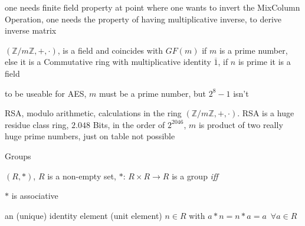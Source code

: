 \documentclass[landscape, a4paper]{article}
\begin{document}
\begin{minipage}[t]{0.2\linewidth}
\begin{betterlist}
\begin{betterlist}
\begin{betterlist}
				\item one needs finite field property at point where one wants to invert the MixColumn Operation, one needs the property of having multiplicative inverse, to derive inverse matrix
			\end{betterlist}
			\item $(\mathbb{Z}/m\mathbb{Z}, +, \cdot)$, is a \alert{field} and coincides with $GF(m)$ if $m$ is a prime number, else it is a Commutative ring with multiplicative identity $\overline{1}$, if $n$ is prime it is a field
			\begin{betterlist}
				\item to be useable for AES, $m$ must be a prime number, but $2^8-1$ isn't
				\item RSA, modulo arithmetic, calculations in the ring $(\mathbb{Z}/m\mathbb{Z}, +, \cdot)$. RSA is a huge residue class ring, $2.048$ Bits, in the order of $2^{2046}$, $m$ is product of two really huge prime numbers, just on table not possible
			\end{betterlist}
		\end{betterlist}
		\begin{betterlist}
			\item \alert{Groups}
			\begin{betterlist}
				\item $(R, *)$, $R$ is a non-empty set, $*$: $R \times R \rightarrow R$ is a \alert{group} \textit{iff}
				\begin{betterlist}
					\item $*$ is \alert{associative}
					\item an \alert{(unique) identity element} (unit element) $n \in R$ with $a * n = n * a = a \enspace\forall a\in R$

\end{betterlist}
\end{betterlist}
\end{betterlist}
\end{betterlist}
\end{minipage}
\end{document}
